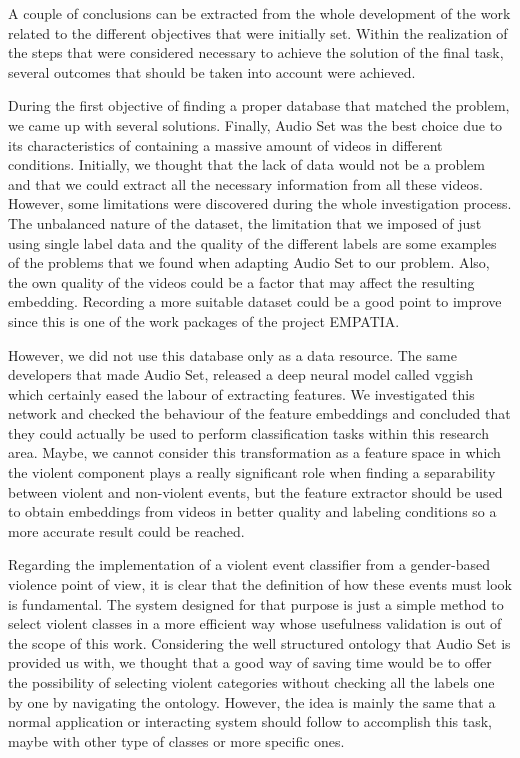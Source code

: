 
	A couple of conclusions can be extracted from the whole development of the work related to the different objectives that were initially set. Within the realization of the steps that were considered necessary to achieve the solution of the final task, several outcomes that should be taken into account were achieved.
	
	During the first objective of finding a proper database that matched the problem, we came up with several solutions. Finally, Audio Set was the best choice due to its characteristics of containing a massive amount of videos in different conditions. Initially, we thought that the lack of data would not be a problem and that we could extract all the necessary information from all these videos. However, some limitations were discovered during the whole investigation process. The unbalanced nature of the dataset, the limitation that we imposed of just using single label data and the quality of the different labels are some examples of the problems that we found when adapting Audio Set to our problem. Also, the own quality of the videos could be a factor that may affect the resulting embedding. Recording a more suitable dataset could be a good point to improve since this is one of the work packages of the project EMPATIA. 
	
	However, we did not use this database only as a %
	data resource. The same developers that made Audio Set, released a deep neural model called \acrshort{vgg}ish which certainly eased the labour of extracting features. We investigated this network and checked the behaviour of the feature embeddings and concluded that they could actually be used to perform classification tasks within this research area. Maybe, we cannot consider this transformation as a feature space in which the violent component plays a really significant role when finding a separability between violent and non-violent events, but the feature extractor should be used to obtain embeddings from videos in better quality and labeling conditions so a more accurate result could be reached. 
	
	Regarding the implementation of a violent event classifier from a gender-based violence point of view, it is clear that the definition of how these events must look is fundamental. The system designed for that purpose is just a simple method to select violent classes in a more efficient way whose usefulness validation is out of %
	the scope of this work. Considering the well structured ontology that Audio Set is provided us with, we thought that a good way of saving time would be to offer the possibility of selecting violent categories without checking all the labels one by one by navigating the ontology. However, the idea is mainly the same that a normal application or interacting system should follow to accomplish this task, maybe with other type of classes or more specific ones.
	
